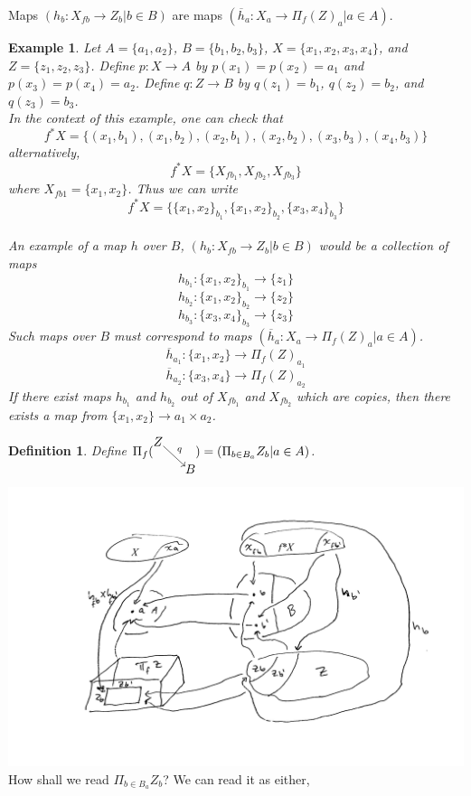 \documentclass{article}
\theoremstyle{problemstyle}
\theoremstyle{problemstyle}
\newtheorem{definition}{Definition}
\theoremstyle{problemstyle}
\newtheorem{example}{Example}
\theoremstyle{problemstyle}
\theoremstyle{problemstyle}
\theoremstyle{problemstyle}
\theoremstyle{problemstyle}
\theoremstyle{problemstyle}
\begin{document}
Maps $(h_b:X_{fb} \rightarrow Z_b|b \in B)$ are maps $(\overline{h}_a:X_a\rightarrow \Pi_f(Z)_a|a \in A)$.\\

\begin{example}

Let $A = \{a_1,a_2\}$, $B = \{b_1,b_2,b_3\}$, $X = \{x_1,x_2,x_3,x_4\}$, and $Z = \{z_1,z_2,z_3\}$. Define $p:X\rightarrow A$ by $p(x_1) = p(x_2) = a_1$ and $p(x_3) = p(x_4) = a_2$.  Define $q:Z\rightarrow B$ by $q(z_1) = b_1$, $q(z_2) = b_2$, and $q(z_3) = b_3$. \\

In the context of this example, one can check that $$f^*X = \{(x_1,b_1),(x_1,b_2),(x_2,b_1),(x_2,b_2),(x_3,b_3),(x_4,b_3)\}$$  alternatively, $$f^*X = \{X_{fb_1},X_{fb_2},X_{fb_3}\}$$ where $X_{fb1} = \{x_1,x_2\}$. Thus we can write $$f^*X = \{\{x_1,x_2\}_{b_1},\{x_1,x_2\}_{b_2},\{x_3,x_4\}_{b_3}\}$$\\ 

An example of a map $h$ over $B$, $(h_b:X_{fb} \rightarrow Z_b|b \in B)$ would be a collection of maps $$h_{b_1}:\{x_1,x_2\}_{b_1} \rightarrow \{z_1\}$$
$$h_{b_2}:\{x_1,x_2\}_{b_2} \rightarrow \{z_2\}$$
$$h_{b_3}:\{x_3,x_4\}_{b_3} \rightarrow \{z_3\}$$
Such maps over $B$ must correspond to maps $(\overline{h}_a:X_a\rightarrow \Pi_f(Z)_a|a \in A)$. 
$$\overline{h}_{a_1}:\{x_1,x_2\}\rightarrow \Pi_f(Z)_{a_1}$$
$$\overline{h}_{a_2}:\{x_3,x_4\}\rightarrow \Pi_f(Z)_{a_2}$$
If there exist maps $h_{b_1}$ and $h_{b_2}$ out of $X_{fb_1}$ and $X_{fb_2}$ which are copies, then there exists a map from $\{x_1,x_2\} \rightarrow {a_1}\times{a_2}$. 
\end{example}

\begin{definition}
Define $\Pi_f(\begin{tikzcd}[cramped, sep=small] Z \arrow[rd, "q", start anchor={[xshift=-.6ex, yshift= .7ex]},end anchor={[xshift=.7ex, yshift= -.7ex]}]  &  \\  &  B \end{tikzcd}) = (\Pi_{b \in B_a}Z_b|a \in A)$. 
\end{definition}

\includegraphics[scale=.12]{Figure4_dependent_product}
\flushleft
How shall we read $\Pi_{b\in B_a}Z_b$? We can read it as either, 
\end{document}
